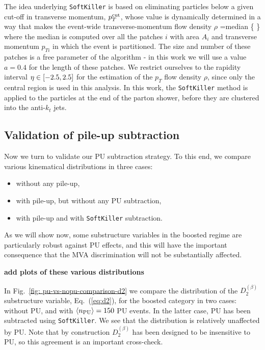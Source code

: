 The idea underlying {\tt SoftKiller} is based on eliminating particles
below a given cut-off in transverse momentum, $p_T^{\rm cut}$, whose
value is dynamically determined in a way that makes the event-wide
transverse-momentum flow density $\rho$
\be
\rho={\rm median} \Bigg\{ \Bigg\}
\ee
where the median is computed over all the patches $i$ with area
$A_i$ and transverse momentum $p_{Ti}$ in which the event is partitioned.
%
The size and number of these patches is a free parameter of the algorithm -
in this work we will use a value $a=0.4$ for the length of these
patches.
%
We restrict ourselves to the rapidity interval
$\eta \in \left[ -2.5, 2.5\right]$ for the estimation of the
$p_T$ flow density $\rho$, since only the central region
is used in this analysis.
%
In this work, the {\tt SoftKiller} method is applied
to the particles at the end of the parton shower, before
they are clustered into the anti-$k_t$ jets.


\subsection{Validation of pile-up subtraction}

Now we turn to validate our PU subtraction strategy.
%
To this end, we compare various kinematical distributions in three
cases:
\begin{itemize}
\item without any pile-up,
\item with pile-up, but without any PU subtraction,
  \item with pile-up and with {\tt SoftKiller} subtraction.
\end{itemize}
As we will show now, some substructure variables in the boosted
regime are particularly robust against PU effects, and this
will have the important consequence that the MVA discrimination
will not be substantially affected.

{\bf add plots of these various distributions}

In Fig.~\ref{fig: pu-vs-nopu-comparison-d2} we
compare the distribution of the $D_2^{(\beta)}$
    substructure variable, Eq.~(\ref{eq:d2}), for the
    boosted category in two cases: without PU, and
    with $\left\langle n_{\rm PU}\right\rangle=150$ PU events.
    In the latter case, PU has been subtracted using
    {\tt SoftKiller}.
    We see that the distribution is relatively unaffected by PU.
    Note that by construction $D_2^{(\beta)}$ has been designed
    to be insensitive to PU, so this agreement is an important
    cross-check.

